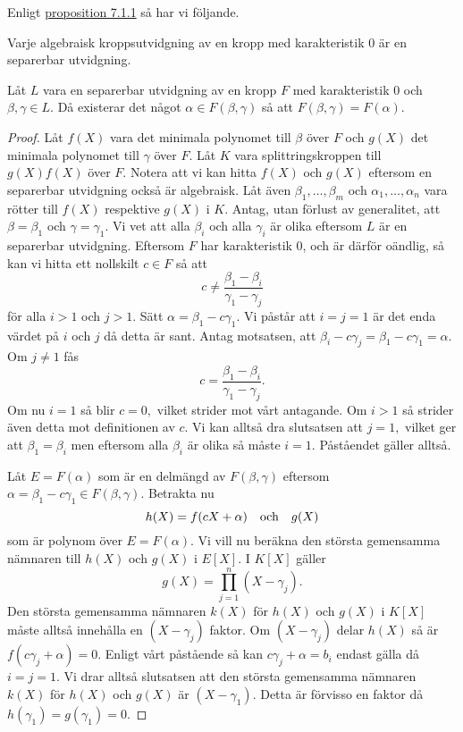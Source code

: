 \documentclass{article}
\theoremstyle{definition}
\begin{document}
Enligt \hyperlink{irrsep}{proposition 7.1.1} så har vi följande. 
\hypertarget{prop7.1.2}{}
\begin{myprop}{}{}
  Varje algebraisk kroppsutvidgning av en kropp med karakteristik 0 är en separerbar utvidgning. 
\end{myprop}

\hypertarget{lemma7.1.3}{}
\begin{mylemma}{}{}
  Låt $L$ vara en separerbar utvidgning av en kropp $F$ med karakteristik 0 och $\beta, \gamma \in L$. Då existerar det 
  något $\alpha \in F(\beta, \gamma)$ så att $F(\beta, \gamma) = F(\alpha)$.
\end{mylemma}

\begin{proof}
  Låt $f(X)$ vara det minimala polynomet till $\beta$ över $F$ och $g(X)$ det minimala polynomet till $\gamma$ över $F$. Låt $K$ vara 
  splittringskroppen till $g(X)f(X)$ över $F$. Notera att vi kan hitta $f(X)$ och $g(X)$ eftersom en separerbar utvidgning också är algebraisk. 
  Låt även $\beta_1, \ldots, \beta_m$ och $\alpha_1, \ldots, \alpha_n$ vara rötter till $f(X)$ respektive $g(X)$ i $K$. Antag, 
  utan förlust av generalitet, att $\beta = \beta_1$ och $\gamma = \gamma_1.$ Vi vet att alla $\beta_i$ och alla $\gamma_i$ är olika 
  eftersom $L$ är en separerbar utvidgning. 
  Eftersom $F$ har karakteristik 0, och är därför oändlig, så kan vi 
  hitta ett nollskilt $c \in F$ så att 
  \[c \neq \frac{\beta_1 - \beta_i}{\gamma_1 - \gamma_j}\]
  för alla $i > 1$ och $j > 1.$ Sätt $\alpha = \beta_1 - c\gamma_1.$ Vi påstår att $i = j = 1$ är det enda värdet på $i$ och $j$ då detta är sant. 
  Antag motsatsen, att $\beta_i - c \gamma_j = \beta_1 - c\gamma_1 = \alpha.$ Om $j \neq 1$ fås
  \[ c = \frac{\beta_1 - \beta_i}{\gamma_1 - \gamma_j}. \]
  Om nu $i = 1$ så blir $c = 0,$ vilket strider mot vårt antagande. Om $i > 1$ så strider även detta mot definitionen av $c$. Vi kan alltså 
  dra slutsatsen att $j = 1,$ vilket ger att $\beta_1 = \beta_i$ men eftersom alla $\beta_i$ är olika så måste $i = 1.$ Påståendet gäller alltså.

  Låt $E = F(\alpha)$ som är en delmängd av $F(\beta, \gamma)$ eftersom $\alpha = \beta_1-c\gamma_1 \in F(\beta, \gamma).$
  Betrakta nu 
  \[h(X) = f(cX + \alpha) \quad \textnormal{och} \quad g(X)\]
  som är polynom över $E = F(\alpha)$. Vi vill nu beräkna den största gemensamma nämnaren till $h(X)$ och $g(X)$ i $E[X].$ I $K[X]$
  gäller
  \[ g(X) = \prod_{j = 1}^{n}(X-\gamma_j). \]
  Den största gemensamma nämnaren $k(X)$ för $h(X)$ och $g(X)$ i $K[X]$ måste alltså innehålla en $(X-\gamma_j)$ faktor. Om $(X - \gamma_j)$ delar 
  $h(X)$ så är $f(c\gamma_j + \alpha) = 0.$ Enligt vårt påstående så kan $c\gamma_j + \alpha = b_i$ endast gälla då $i = j = 1.$ Vi 
  drar alltså slutsatsen att den största gemensamma nämnaren $k(X)$ för $h(X)$ och $g(X)$ är $(X - \gamma_1)$. Detta är förvisso en faktor 
  då $h(\gamma_1) = g(\gamma_1) = 0.$ 


\end{proof}
\end{document}
